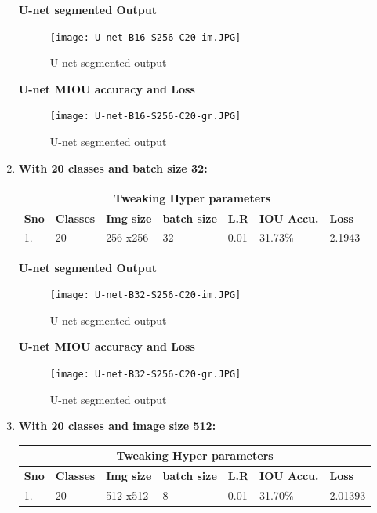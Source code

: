 \documentclass{IEEEtran}
\begin{document}
\begin{enumerate}
\textbf{U-net segmented Output}

\begin{figure}[h]
    \centering
    \captionsetup{justification=centering}
    \texttt{[image: U-net-B16-S256-C20-im.JPG]}
    \caption{U-net segmented output}
    \label{fig:Binary class segmented output}
\end{figure}


\textbf{U-net MIOU accuracy and Loss}

\begin{figure}[h]
    \centering
    \captionsetup{justification=centering}
    \texttt{[image: U-net-B16-S256-C20-gr.JPG]}
    \caption{U-net segmented output}
    \label{fig:Binary class segmented output}
\end{figure}

\newpage

\item \textbf{With 20 classes and batch size 32:}
\newline
\begin{tabular}{ |p{0.6cm}|p{1.2cm}|p{0.6cm}|p{0.6cm}|p{0.6cm}|p{0.8cm}|p{0.8cm}|}
 \hline
 \multicolumn{7}{|c|}{\textbf{Tweaking Hyper parameters}} \\
 \hline
 \textbf{Sno} & \textbf{Classes} & \textbf{Img size} & \textbf{batch size} & \textbf{L.R} & \textbf{IOU Accu.} & \textbf{Loss} \\
 \hline
 1. & 20   & 256 x256   & 32  & 0.01 & 31.73\% & 2.1943 \\
 \hline
\end{tabular}


\textbf{U-net segmented Output}

\begin{figure}[h]
    \centering
    \captionsetup{justification=centering}
    \texttt{[image: U-net-B32-S256-C20-im.JPG]}
    \caption{U-net segmented output}
    \label{fig:Binary class segmented output}
\end{figure}


\textbf{U-net MIOU accuracy and Loss}

\begin{figure}[h]
    \centering
    \captionsetup{justification=centering}
    \texttt{[image: U-net-B32-S256-C20-gr.JPG]}
    \caption{U-net segmented output}
    \label{fig:Binary class segmented output}
\end{figure}

\item \textbf{With 20 classes and image size 512:}
\newline
\begin{tabular}{ |p{0.6cm}|p{1.2cm}|p{0.6cm}|p{0.6cm}|p{0.6cm}|p{0.8cm}|p{0.8cm}|}
 \hline
 \multicolumn{7}{|c|}{\textbf{Tweaking Hyper parameters}} \\
 \hline
 \textbf{Sno} & \textbf{Classes} & \textbf{Img size} & \textbf{batch size} & \textbf{L.R} & \textbf{IOU Accu.} & \textbf{Loss} \\
 \hline
 1. & 20   & 512 x512   & 8  & 0.01 & 31.70\% & 2.01393 \\
 \hline
\end{tabular}



\end{enumerate}
\end{document}
